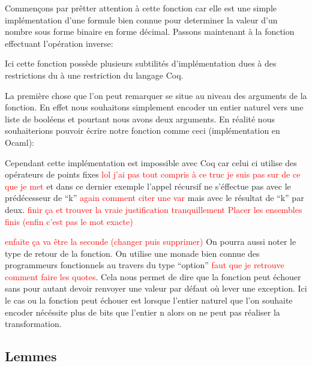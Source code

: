 \documentclass {article}
\newcommand{\codefrom}[3]
           {}
\newcommand{\codefromOcaml}[3]
           {}
\theoremstyle{definition}
\theoremstyle{remark}
\newcommand{\todo}[1]{\textcolor{red}{#1}}
\begin{document}
\codefrom{src}{binary}{bitn}

Commençons par prêtter attention à cette fonction car elle est une simple implémentation
d'une formule bien connue pour determiner la valeur d'un nombre sous forme binaire
en forme décimal. Passons maintenant à la fonction effectuant l'opération inverse:

\codefrom{src}{binary}{nbit}


Ici cette fonction possède plusieurs subtilités d'implémentation dues à des restrictions du
à une restriction du langage Coq.

La première chose que l'on peut remarquer se situe au niveau des arguments de
la fonction. En effet nous souhaitons simplement encoder un entier naturel vers
une liste de booléens et pourtant nous avons deux arguments.
En réalité nous souhaiterions pouvoir écrire notre fonction comme ceci
(implémentation en Ocaml):
\codefromOcaml{rapport}{example}{nbit}

Cependant cette implémentation est impossible avec Coq car celui ci utilise
des opérateurs de points fixes \todo{lol j'ai pas tout compris à ce truc je suis
  pas sur de ce que je met} et dans ce dernier exemple l'appel récursif ne s'éffectue
pas avec le prédécesseur de ``k'' \todo{again comment citer une var} mais avec le
résultat de ``k'' par deux. \todo{finir ça et trouver la vraie justification tranquillement}
\todo{Placer les ensembles finis (enfin c'est pas le mot exacte)}



\todo{enfaite ça va être la seconde (changer puis supprimer)}
On pourra aussi noter le type de retour de la fonction.
On utilise une monade bien connue des programmeurs fonctionnels au travers du type
``option'' \todo{faut que je retrouve comment faire les quotes}. Cela nous permet de
dire que la fonction peut échouer sans pour autant devoir renvoyer une valeur par
défaut où lever une exception. Ici le cas ou la fonction peut échouer est lorsque
l'entier naturel que l'on souhaite encoder nécéssite plus de bits que l'entier n alors
on ne peut pas réaliser la transformation.





\subsection{Lemmes}
\end{document}

